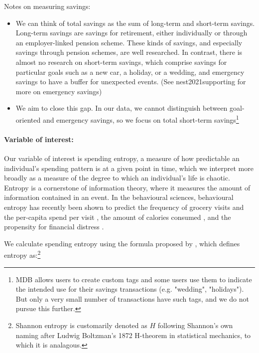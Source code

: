 Notes on measuring savings:
\begin{itemize}

    \item We can think of total savings as the sum of long-term and short-term
        savings. Long-term savings are savings for retirement, either
        individually or through an employer-linked pension scheme. These kinds
        of savings, and especially savings through pension schemes, are well
        researched. In contrast, there is almost no research on short-term
        savings, which comprise savings for particular goals such as a new car,
        a holiday, or a wedding, and emergency savings to have a buffer for
        unexpected events. (See nest2021supporting for more on emergency
        savings)

    \item We aim to close this gap. In our data, we cannot distinguish between
        goal-oriented and emergency savings, so we focus on total short-term
        savings\footnote{MDB allows users to create custom tags and some users
            use them to indicate the intended use for their savings
            transactions (e.g. "wedding", "holidays"). But only a very small
        number of transactions have such tags, and we do not pursue this
    further.}


\end{itemize}

\paragraph{Variable of interest:}%
\label{par:variable_of_interest_}
Our variable of interest is spending entropy, a measure of how predictable an
individual's spending pattern is at a given point in time, which we interpret
more broadly as a measure of the degree to which an individual's life is
chaotic. Entropy is a cornerstone of information theory, where it measures the
amount of information contained in an event. In the behavioural sciences,
behavioural entropy has recently been shown to predict the frequency of grocery
visits and the per-capita spend per visit \citep{guidotti2015behavioral}, the
amount of calories consumed \citep{skatova2019those}, and the propensity for
financial distress \citep{muggleton2020evidence}.

We calculate spending entropy using the formula proposed by
\citet{shannon1948mathematical}, which defines entropy as:\footnote{Shannon
    entropy is customarily denoted as $H$ following Shannon's own naming after
    Ludwig Boltzman's 1872 H-theorem in statistical mechanics, to which it is
analagous.}

